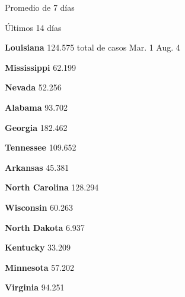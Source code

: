 Promedio de 7 días

Últimos 14 días

\textbf{Louisiana} 124.575 total de casos Mar. 1 Aug. 4

\href{https://www.nytimes.com/interactive/2020/us/mississippi-coronavirus-cases.html}{}

\textbf{Mississippi} 62.199

\href{https://www.nytimes.com/interactive/2020/us/nevada-coronavirus-cases.html}{}

\textbf{Nevada} 52.256

\href{https://www.nytimes.com/interactive/2020/us/alabama-coronavirus-cases.html}{}

\textbf{Alabama} 93.702

\href{https://www.nytimes.com/interactive/2020/us/georgia-coronavirus-cases.html}{}

\textbf{Georgia} 182.462

\href{https://www.nytimes.com/interactive/2020/us/tennessee-coronavirus-cases.html}{}

\textbf{Tennessee} 109.652

\href{https://www.nytimes.com/interactive/2020/us/arkansas-coronavirus-cases.html}{}

\textbf{Arkansas} 45.381

\href{https://www.nytimes.com/interactive/2020/us/north-carolina-coronavirus-cases.html}{}

\textbf{North Carolina} 128.294

\href{https://www.nytimes.com/interactive/2020/us/wisconsin-coronavirus-cases.html}{}

\textbf{Wisconsin} 60.263

\href{https://www.nytimes.com/interactive/2020/us/north-dakota-coronavirus-cases.html}{}

\textbf{North Dakota} 6.937

\href{https://www.nytimes.com/interactive/2020/us/kentucky-coronavirus-cases.html}{}

\textbf{Kentucky} 33.209

\href{https://www.nytimes.com/interactive/2020/us/minnesota-coronavirus-cases.html}{}

\textbf{Minnesota} 57.202

\href{https://www.nytimes.com/interactive/2020/us/virginia-coronavirus-cases.html}{}

\textbf{Virginia} 94.251

\href{https://www.nytimes.com/interactive/2020/us/indiana-coronavirus-cases.html}{}


